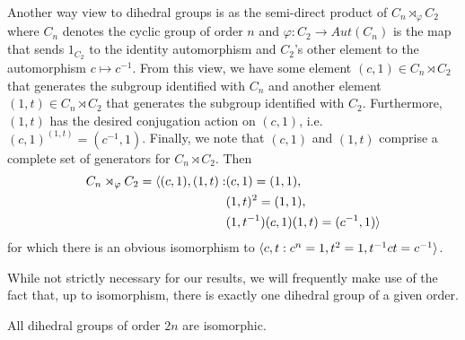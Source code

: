 \documentclass[main.tex]{subfiles}
\begin{document}
Another way view to dihedral groups is as the semi-direct product of $C_n \rtimes_\varphi C_2$ where $C_n$ denotes the cyclic group of order $n$ and $\varphi : C_2 \to Aut(C_n)$ is the map that sends $1_{C_2}$ to the identity automorphism and $C_2$'s other element to the automorphism $c \mapsto c^{-1}$. From this view, we have some element $(c, 1) \in C_n \rtimes C_2$ that generates the subgroup identified with $C_n$ and another element $(1, t) \in C_n \rtimes C_2$ that generates the subgroup identified with $C_2$. Furthermore, $(1, t)$ has the desired conjugation action on $(c, 1)$, i.e. $(c,1)^{(1,t)} = (c^{-1}, 1)$. Finally, we note that $(c, 1)$ and $(1, t)$ comprise a complete set of generators for $C_n \rtimes C_2$. Then 
\begin{align*}
C_n \rtimes_\varphi C_2 = \langle (c, 1), (1, t) : &(c, 1) = (1, 1), \\
&(1, t)^2 = (1, 1), \\
&(1, t^{-1})(c, 1)(1, t) = (c^{-1}, 1) \rangle
\end{align*}
for which there is an obvious isomorphism to $\langle c, t : c^n = 1, t^2 = 1, t^{-1} c t = c^{-1} \rangle$.

\hss

While not strictly necessary for our results, we will frequently make use of the fact that, up to isomorphism, there is exactly one dihedral group of a given order.

\begin{proposition}
All dihedral groups of order $2n$ are isomorphic.
\end{proposition}
\end{document}
